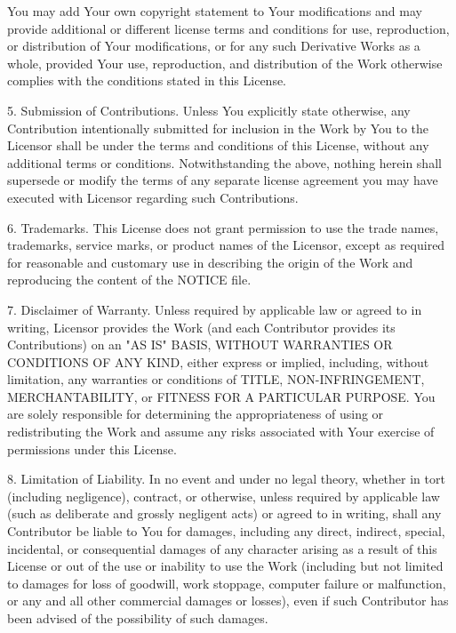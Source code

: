 \documentclass[10pt]{article}
\begin{document}
      You may add Your own copyright statement to Your modifications and
      may provide additional or different license terms and conditions
      for use, reproduction, or distribution of Your modifications, or
      for any such Derivative Works as a whole, provided Your use,
      reproduction, and distribution of the Work otherwise complies with
      the conditions stated in this License.

   5. Submission of Contributions. Unless You explicitly state otherwise,
      any Contribution intentionally submitted for inclusion in the Work
      by You to the Licensor shall be under the terms and conditions of
      this License, without any additional terms or conditions.
      Notwithstanding the above, nothing herein shall supersede or modify
      the terms of any separate license agreement you may have executed
      with Licensor regarding such Contributions.

   6. Trademarks. This License does not grant permission to use the trade
      names, trademarks, service marks, or product names of the Licensor,
      except as required for reasonable and customary use in describing the
      origin of the Work and reproducing the content of the NOTICE file.

   7. Disclaimer of Warranty. Unless required by applicable law or
      agreed to in writing, Licensor provides the Work (and each
      Contributor provides its Contributions) on an "AS IS" BASIS,
      WITHOUT WARRANTIES OR CONDITIONS OF ANY KIND, either express or
      implied, including, without limitation, any warranties or conditions
      of TITLE, NON-INFRINGEMENT, MERCHANTABILITY, or FITNESS FOR A
      PARTICULAR PURPOSE. You are solely responsible for determining the
      appropriateness of using or redistributing the Work and assume any
      risks associated with Your exercise of permissions under this License.

   8. Limitation of Liability. In no event and under no legal theory,
      whether in tort (including negligence), contract, or otherwise,
      unless required by applicable law (such as deliberate and grossly
      negligent acts) or agreed to in writing, shall any Contributor be
      liable to You for damages, including any direct, indirect, special,
      incidental, or consequential damages of any character arising as a
      result of this License or out of the use or inability to use the
      Work (including but not limited to damages for loss of goodwill,
      work stoppage, computer failure or malfunction, or any and all
      other commercial damages or losses), even if such Contributor
      has been advised of the possibility of such damages.
\end{document}
